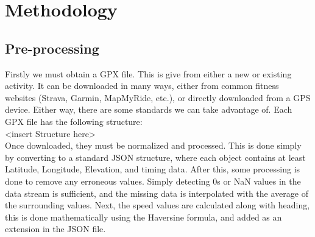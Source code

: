 \documentclass[12pt,a4paper]{report}
\begin{document}
\tableofcontents
\newpage
\section{Methodology}

\subsection{Pre-processing}
Firstly we must obtain a GPX file. This is give from either a new or existing activity. It can be downloaded in many ways, either from common fitness websites (Strava, Garmin, MapMyRide, etc.), or directly
downloaded from a GPS device. Either way, there are some standards we can take advantage of. Each GPX file has the following structure:
\\ <insert Structure here>
\\
Once downloaded, they must be normalized and processed. This is done simply by converting to a standard JSON structure, where each object contains at least Latitude, Longitude, Elevation, and timing data.
After this, some processing is done to remove any erroneous values. Simply detecting 0s or NaN values in the data stream is sufficient, and the missing data is interpolated with the average of the surrounding values.
Next, the speed values are calculated along with heading, this is done mathematically using the Haversine formula, and added as an extension in the JSON file.
\end{document}
